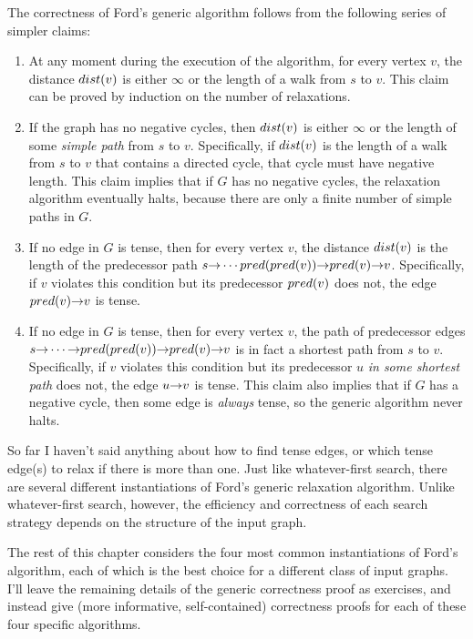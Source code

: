 The correctness of Ford’s generic algorithm follows from the following series of simpler claims:
\begin{enumerate}
\item At any moment during the execution of the algorithm, for every vertex $v$, the distance $dist(v)$ is either $\infty$ or the length of a walk from $s$ to $v$.
This claim can be proved by induction on the number of relaxations.
\item If the graph has no negative cycles, then $dist(v)$ is either $\infty$ or the length of some \textit{simple path} from $s$ to $v$.
Specifically, if $dist(v)$ is the length of a walk from $s$ to $v$ that contains a directed cycle, that cycle must have negative length.
This claim implies that if $G$ has no negative cycles, the relaxation algorithm eventually halts, because there are only a finite number of simple paths in $G$.
\item If no edge in $G$ is tense, then for every vertex $v$, the distance $dist(v)$ is the length of the predecessor path $s\mathord{\rightarrow}\cdots pred(pred(v))\mathord{\rightarrow}pred(v)\mathord{\rightarrow}v$.
Specifically, if $v$ violates this condition but its predecessor $pred(v)$ does not, the edge $pred(v)\mathord{\rightarrow}v$ is tense.
\item If no edge in $G$ is tense, then for every vertex $v$, the path of predecessor edges $s\mathord{\rightarrow}\cdots\mathord{\rightarrow}pred(pred(v))\mathord{\rightarrow}pred(v)\mathord{\rightarrow}v$ is in fact a shortest path from $s$ to $v$.
Specifically, if $v$ violates this condition but its predecessor $u$ \textit{in some shortest path} does not, the edge $u\mathord{\rightarrow}v$ is tense.
This claim also implies that if $G$ has a negative cycle, then some edge is \textit{always} tense, so the generic algorithm never halts.
\end{enumerate}
So far I haven’t said anything about how to find tense edges, or which tense edge(s) to relax if there is more than one.
Just like whatever-first search, there are several different instantiations of Ford’s generic relaxation algorithm.
Unlike whatever-first search, however, the efficiency and correctness of each search strategy depends on the structure of the input graph.

The rest of this chapter considers the four most common instantiations of Ford’s algorithm, each of which is the best choice for a different class of input graphs.
I’ll leave the remaining details of the generic correctness proof as exercises, and instead give (more informative, self-contained) correctness proofs for each of these four specific algorithms.

